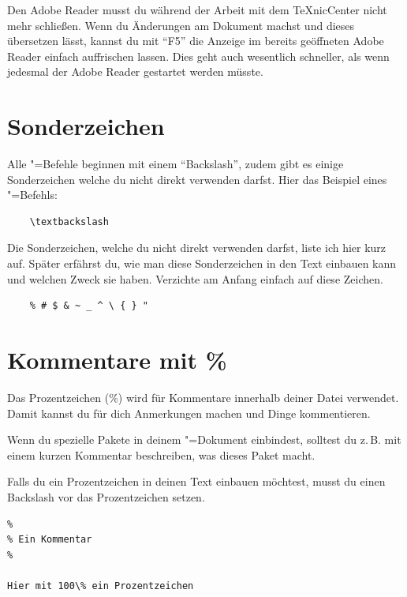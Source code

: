 Den Adobe Reader musst du während der Arbeit mit dem TeXnicCenter nicht mehr schließen. Wenn du Änderungen am Dokument machst und dieses übersetzen lässt, kannst du mit \enquote{F5} die Anzeige im bereits geöffneten Adobe Reader einfach auffrischen lassen. Dies geht auch wesentlich schneller, als wenn jedesmal der Adobe Reader gestartet werden müsste.


\section{Sonderzeichen}
\label{Sonderzeichen}

Alle \DMLLaTeX"=Befehle beginnen mit einem \enquote{Backslash}, zudem gibt es einige Sonderzeichen welche du nicht direkt verwenden darfst. Hier das Beispiel eines \DMLLaTeX"=Befehls:
\begin{lstlisting}
	\textbackslash
\end{lstlisting}

Die Sonderzeichen, welche du nicht direkt verwenden darfst, liste ich hier kurz auf. Später erfährst du, wie man diese Sonderzeichen in den Text einbauen kann und welchen Zweck sie haben. Verzichte am Anfang einfach auf diese Zeichen.
\begin{lstlisting}
	% # $ & ~ _ ^ \ { } "
\end{lstlisting}

\section{Kommentare mit \%}

Das Prozentzeichen (\%) wird für Kommentare innerhalb deiner Datei verwendet. Damit kannst du für dich Anmerkungen machen und Dinge kommentieren. 

Wenn du spezielle Pakete in deinem \DMLLaTeX"=Dokument einbindest, solltest du z.\,B. mit einem kurzen Kommentar beschreiben, was dieses Paket macht.

Falls du ein Prozentzeichen in deinen Text einbauen möchtest, musst du einen Backslash vor das Prozentzeichen setzen.
\begin{lstlisting}
%
% Ein Kommentar
%

Hier mit 100\% ein Prozentzeichen
\end{lstlisting}



